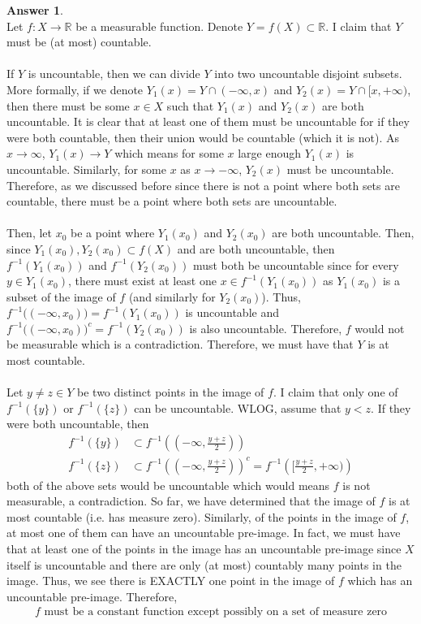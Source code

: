 \documentclass[10pt,a4paper]{article}
\theoremstyle{definition}
\newtheorem*{answer*}{Answer}
\theoremstyle{definition}
\numberwithin{equation}{section}
\begin{document}
\begin{answer*}$ $
\\Let $f: X \to \mathbb{R}$ be a measurable function. Denote $Y = f(X) \subset \mathbb{R}$. I claim that $Y$ must be (at most) countable. 
\\
\\If $Y$ is uncountable, then we can divide $Y$ into two uncountable disjoint subsets. More formally, if we denote $Y_1(x) = Y \cap (-\infty, x)$ and $Y_2(x) = Y \cap [x, +\infty)$, then there must be some $x \in X$ such that $Y_1(x)$ and $Y_2(x)$ are both uncountable. It is clear that at least one of them must be uncountable for if they were both countable, then their union would be countable (which it is not). As $x \to \infty$, $Y_1(x) \to Y$ which means for some $x$ large enough $Y_1(x)$ is uncountable. Similarly, for some $x$ as $x \to -\infty$,  $Y_2(x)$ must be uncountable. Therefore, as we discussed before since there is not a point where both sets are countable, there must be a point where both sets are uncountable. 
\\
\\Then, let $x_0$ be a point where $Y_1(x_0)$ and $Y_2(x_0)$ are both uncountable. Then, since $Y_1(x_0), Y_2(x_0) \subset f(X)$ and are both uncountable, then $f^{-1}(Y_1(x_0))$ and $f^{-1}(Y_2(x_0))$ must both be uncountable since for every $y \in Y_1(x_0)$, there must exist at least one $x \in f^{-1}(Y_1(x_0))$ as $Y_1(x_0)$ is a subset of the image of $f$ (and similarly for $Y_2(x_0)$). Thus, $f^{-1}\big((-\infty, x_0)\big) = f^{-1}(Y_1(x_0))$ is uncountable and $f^{-1}\big((-\infty, x_0)\big)^c = f^{-1}(Y_2(x_0))$ is also uncountable. Therefore, $f$ would not be measurable which is a contradiction. Therefore, we must have that $Y$ is at most countable. 
\\
\\Let $y \neq z \in Y$ be two distinct points in the image of $f$. I claim that only one of $f^{-1}(\{y\})$ or $f^{-1}(\{z\})$ can be uncountable. WLOG, assume that $y < z$. If they were both uncountable, then 
\begin{align*}
f^{-1}(\{y\}) &\subset f^{-1}\left(\left(-\infty, \frac{y + z}{2}\right)\right)\\
f^{-1}(\{z\}) &\subset f^{-1}\left(\left(-\infty, \frac{y + z}{2}\right)\right)^c = f^{-1}\left(\bigg[ \frac{y + z}{2}, + \infty \bigg) \right)
\end{align*}
both of the above sets would be uncountable which would means $f$ is not measurable, a contradiction. So far, we have determined that the image of $f$ is at most countable (i.e. has measure zero). Similarly, of the points in the image of $f$, at most one of them can have an uncountable pre-image. In fact, we must have that at least one of the points in the image has an uncountable pre-image since $X$ itself is uncountable and there are only (at most) countably many points in the image. Thus, we see there is EXACTLY one point in the image of $f$ which has an uncountable pre-image. Therefore,
\begin{align*}
\boxed{\text{$f$ must be a constant function except possibly on a set of measure zero}}
\end{align*}
\end{answer*}
\end{document}
